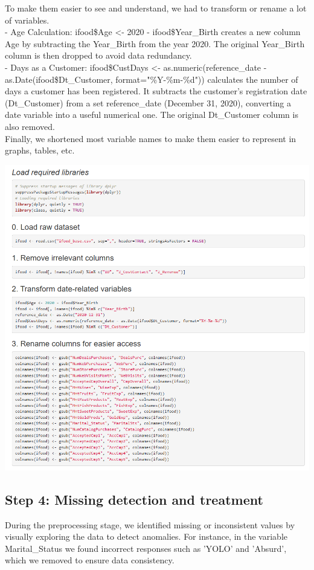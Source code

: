 \documentclass[12pt,a4paper]{article}
\begin{document}
 To make them easier to see and understand, we had to transform or rename a lot of variables.\\

- Age Calculation: ifood\$Age <- 2020 - ifood\$Year\_Birth creates a new column Age by subtracting the Year\_Birth from the year 2020. The original Year\_Birth column is then dropped to avoid data redundancy.\\
- Days as a Customer: ifood\$CustDays <- as.numeric(reference\_date - as.Date(ifood\$Dt\_Customer, format="\%Y-\%m-\%d")) calculates the number of days a customer has been registered. It subtracts the customer's registration date (Dt\_Customer) from a set reference\_date (December 31, 2020), converting a date variable into a useful numerical one. The original Dt\_Customer column is also removed.\\

Finally, we shortened most variable names to make them easier to represent in graphs, tables, etc.

\includegraphics[width=\textwidth]{Imatges/pre1.png}

\subsection{Step 4: Missing detection and treatment}
During the preprocessing stage, we identified missing or inconsistent values by visually exploring the data to detect anomalies. For instance, in the variable Marital\_Status we found incorrect responses such as 'YOLO' and 'Absurd', which we removed to ensure data consistency.\\
\end{document}
